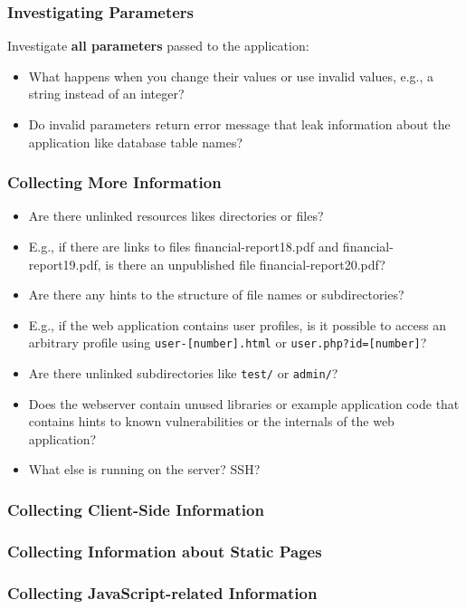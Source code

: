 \documentclass[aspectratio=169]{beamer}
\begin{document}
\begin{frame}
    \frametitle{Investigating Parameters}
    Investigate \textbf{all parameters} passed to the application:
    \begin{itemize}
        \item What happens when you change their values or use invalid values, e.g., a string instead of an integer?
        \item Do invalid parameters return error message that leak information about the application like database table names?
    \end{itemize}
\end{frame}

\begin{frame}
    \frametitle{Collecting More Information}
   \begin{itemize}
       \item Are there unlinked resources likes directories or files?
       \item E.g., if there are links to files financial-report18.pdf and financial-report19.pdf, is there an unpublished file financial-report20.pdf?
       \item Are there any hints to the structure of file names or subdirectories?
       \item E.g., if the web application contains user profiles, is it possible to access an arbitrary profile using \texttt{user-[number].html} or \texttt{user.php?id=[number]}?
       \item Are there unlinked subdirectories like \texttt{test/} or \texttt{admin/}?
       \item Does the webserver contain unused libraries or example application code that contains hints to known vulnerabilities or the internals of the web application? 
       \item What else is running on the server? SSH?
   \end{itemize}
\end{frame}

\begin{frame}
    \frametitle{Collecting Client-Side Information}

\end{frame}

\begin{frame}
    \frametitle{Collecting Information about Static Pages}
\end{frame}

\begin{frame}
    \frametitle{Collecting JavaScript-related Information}
\end{frame}
\end{document}
